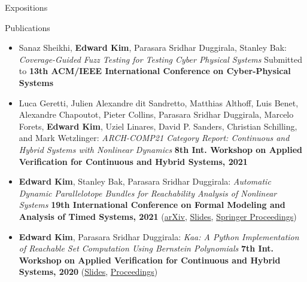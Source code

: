 \documentclass{resume} %
\begin{document}
\begin{rSection}{Expositions}
\begin{itemize}[leftmargin=*]
  \end{itemize}

\end{rSection}
\begin{rSection}{Publications}
  \begin{itemize}[leftmargin=*]
    \item Sanaz Sheikhi, {\bf Edward Kim}, Parasara Sridhar Duggirala, Stanley Bak: \newline
    \textit{Coverage-Guided Fuzz Testing for Testing Cyber Physical Systems} \newline
    Submitted to {\bf 13th ACM/IEEE International Conference on Cyber-Physical Systems}

    \item  Luca Geretti, Julien Alexandre dit Sandretto, Matthias Althoff, Luis Benet, Alexandre Chapoutot, Pieter Collins, Parasara Sridhar Duggirala, Marcelo Forets, {\bf Edward Kim}, Uziel Linares, David P. Sanders, Christian Schilling, and Mark Wetzlinger: \newline
    \textit{ARCH-COMP21 Category Report: Continuous and Hybrid Systems with Nonlinear Dynamics} \newline
    {\bf 8th Int. Workshop on Applied Verification for Continuous and Hybrid Systems, 2021}

    \item {\bf Edward Kim}, Stanley Bak, Parasara Sridhar Duggirala: \newline
    \textit{Automatic Dynamic Parallelotope Bundles for Reachability Analysis of Nonlinear Systems} \newline
    {\bf 19th International Conference on Formal Modeling and Analysis of Timed Systems, 2021} \newline
    (\href{https://arxiv.org/abs/2105.11796}{arXiv}, \href{https://ekim1919.github.io/files/formats21.pdf)}{Slides}, \href{https://link.springer.com/book/10.1007/978-3-030-85037-1}{Springer Proceedings})

    \item {\bf Edward Kim}, Parasara Sridhar Duggirala: \newline
    \textit{Kaa: A Python Implementation of Reachable Set Computation Using Bernstein Polynomials} \newline
    {\bf 7th Int. Workshop on Applied Verification for Continuous and Hybrid Systems, 2020} \newline
    (\href{https://ekim1919.github.io/files/ARCH2020.pdf}{Slides}, \href{https://easychair.org/publications/volume/ARCH20}{Proceedings})


\end{itemize}
\end{rSection}
\end{document}
